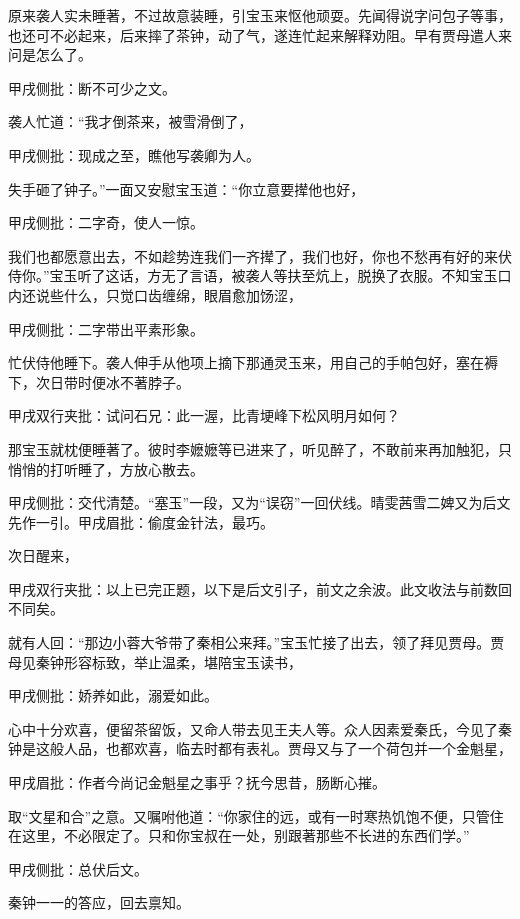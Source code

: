 \begin{parag}
    原来袭人实未睡著，不过故意装睡，引宝玉来怄他顽耍。先闻得说字问包子等事，也还可不必起来，后来摔了茶钟，动了气，遂连忙起来解释劝阻。早有贾母遣人来问是怎么了。\begin{note}甲戌侧批：断不可少之文。\end{note}袭人忙道：“我才倒茶来，被雪滑倒了，\begin{note}甲戌侧批：现成之至，瞧他写袭卿为人。\end{note}失手砸了钟子。”一面又安慰宝玉道：“你立意要撵他也好，\begin{note}甲戌侧批：二字奇，使人一惊。\end{note}我们也都愿意出去，不如趁势连我们一齐撵了，我们也好，你也不愁再有好的来伏侍你。”宝玉听了这话，方无了言语，被袭人等扶至炕上，脱换了衣服。不知宝玉口内还说些什么，只觉口齿缠绵，眼眉愈加饧涩，\begin{note}甲戌侧批：二字带出平素形象。\end{note}忙伏侍他睡下。袭人伸手从他项上摘下那通灵玉来，用自己的手帕包好，塞在褥下，次日带时便冰不著脖子。\begin{note}甲戌双行夹批：试问石兄：此一渥，比青埂峰下松风明月如何？\end{note}那宝玉就枕便睡著了。彼时李嬷嬷等已进来了，听见醉了，不敢前来再加触犯，只悄悄的打听睡了，方放心散去。\begin{note}甲戌侧批：交代清楚。“塞玉”一段，又为“误窃”一回伏线。晴雯茜雪二婢又为后文先作一引。甲戌眉批：偷度金针法，最巧。\end{note}
\end{parag}


\begin{parag}
    次日醒来，\begin{note}甲戌双行夹批：以上已完正题，以下是后文引子，前文之余波。此文收法与前数回不同矣。\end{note}就有人回：“那边小蓉大爷带了秦相公来拜。”宝玉忙接了出去，领了拜见贾母。贾母见秦钟形容标致，举止温柔，堪陪宝玉读书，\begin{note}甲戌侧批：娇养如此，溺爱如此。\end{note}心中十分欢喜，便留茶留饭，又命人带去见王夫人等。众人因素爱秦氏，今见了秦钟是这般人品，也都欢喜，临去时都有表礼。贾母又与了一个荷包并一个金魁星，\begin{note}甲戌眉批：作者今尚记金魁星之事乎？抚今思昔，肠断心摧。\end{note}取“文星和合”之意。又嘱咐他道：“你家住的远，或有一时寒热饥饱不便，只管住在这里，不必限定了。只和你宝叔在一处，别跟著那些不长进的东西们学。”\begin{note}甲戌侧批：总伏后文。\end{note}秦钟一一的答应，回去禀知。
\end{parag}


